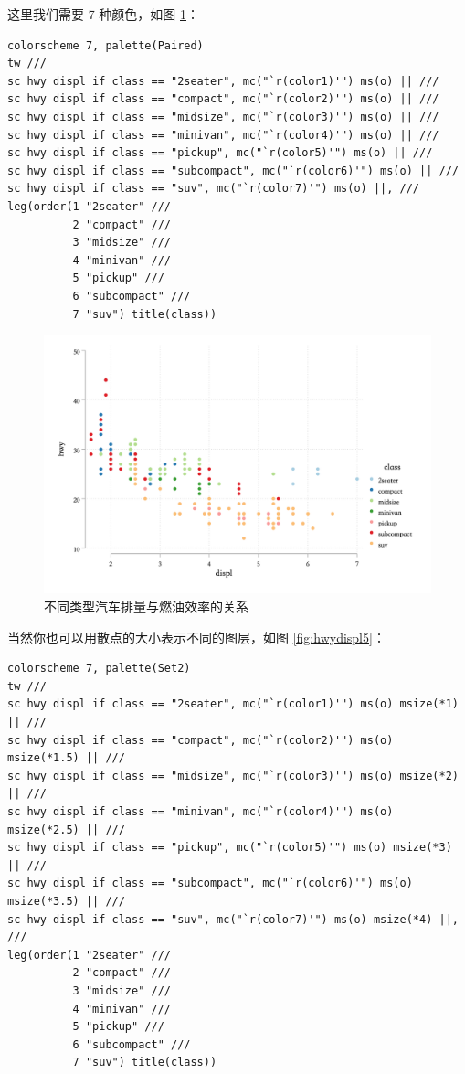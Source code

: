 这里我们需要 7 种颜色，如图 \ref{fig:hwydispl4}：

\begin{lstlisting}
colorscheme 7, palette(Paired)
tw ///
sc hwy displ if class == "2seater", mc("`r(color1)'") ms(o) || ///
sc hwy displ if class == "compact", mc("`r(color2)'") ms(o) || ///
sc hwy displ if class == "midsize", mc("`r(color3)'") ms(o) || ///
sc hwy displ if class == "minivan", mc("`r(color4)'") ms(o) || ///
sc hwy displ if class == "pickup", mc("`r(color5)'") ms(o) || ///
sc hwy displ if class == "subcompact", mc("`r(color6)'") ms(o) || ///
sc hwy displ if class == "suv", mc("`r(color7)'") ms(o) ||, ///
leg(order(1 "2seater" ///
          2 "compact" ///
          3 "midsize" ///
          4 "minivan" ///
          5 "pickup" ///
          6 "subcompact" ///
          7 "suv") title(class))
\end{lstlisting}

\begin{figure}[htbp]
  \centering
  \includegraphics[width=\textwidth]{assets/hwydispl4.png}
  \caption{不同类型汽车排量与燃油效率的关系}
  \label{fig:hwydispl4}
\end{figure}

当然你也可以用散点的大小表示不同的图层，如图 \ref{fig:hwydispl5}：

\begin{lstlisting}
colorscheme 7, palette(Set2)
tw ///
sc hwy displ if class == "2seater", mc("`r(color1)'") ms(o) msize(*1) || ///
sc hwy displ if class == "compact", mc("`r(color2)'") ms(o) msize(*1.5) || ///
sc hwy displ if class == "midsize", mc("`r(color3)'") ms(o) msize(*2) || ///
sc hwy displ if class == "minivan", mc("`r(color4)'") ms(o) msize(*2.5) || ///
sc hwy displ if class == "pickup", mc("`r(color5)'") ms(o) msize(*3) || ///
sc hwy displ if class == "subcompact", mc("`r(color6)'") ms(o) msize(*3.5) || ///
sc hwy displ if class == "suv", mc("`r(color7)'") ms(o) msize(*4) ||, ///
leg(order(1 "2seater" ///
          2 "compact" ///
          3 "midsize" ///
          4 "minivan" ///
          5 "pickup" ///
          6 "subcompact" ///
          7 "suv") title(class))
\end{lstlisting}

